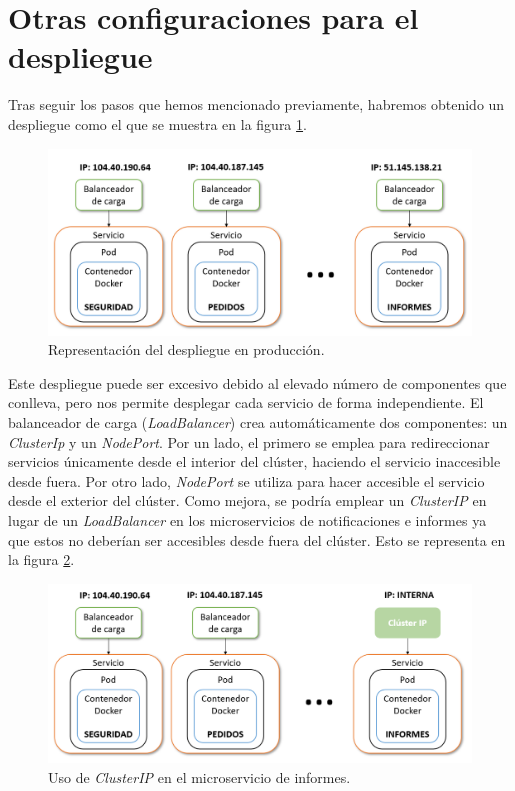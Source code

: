 \documentclass[11pt,spanish,listoffigures]{tfgetsinf}
\begin{document}
\newpage

\section{Otras configuraciones para el despliegue} \label{sect:DespliegueOtros}

Tras seguir los pasos que hemos mencionado previamente, habremos obtenido un despliegue como el que se muestra en la figura \ref{fig:DespliegueProduccion}.

\begin{figure}[h]
\centering
\includegraphics[scale=0.65]{DespliegueProduccion}
\caption{Representación del despliegue en producción.}
\label{fig:DespliegueProduccion}
\end{figure}

Este despliegue puede ser excesivo debido al elevado número de componentes que conlleva, pero nos permite desplegar cada servicio de forma independiente. El balanceador de carga (\textit{LoadBalancer}) crea automáticamente dos componentes: un \textit{ClusterIp} y un \textit{NodePort}. Por un lado, el primero se emplea para redireccionar servicios únicamente desde el interior del clúster, haciendo el servicio inaccesible desde fuera. Por otro lado, \textit{NodePort} se utiliza para hacer accesible el servicio desde el exterior del clúster. Como mejora, se podría emplear un \textit{ClusterIP} en lugar de un \textit{LoadBalancer} en los microservicios de notificaciones e informes ya que estos no deberían ser accesibles desde fuera
 del clúster. Esto se representa en la figura \ref{fig:ClusterIP}.

\begin{figure}[h]
\centering
\includegraphics[scale=0.65]{ClusterIP}
\caption{Uso de \textit{ClusterIP} en el microservicio de informes.}
\label{fig:ClusterIP}
\end{figure}
\end{document}
